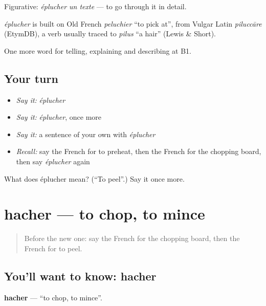 Figurative: \emph{éplucher un texte} — to go through it in detail.

\begin{cousinweb}
\emph{éplucher} is built on Old French \emph{peluchier} \textquotedblleft{}to pick at\textquotedblright{}, from Vulgar Latin \emph{piluccāre} (EtymDB), a verb usually traced to \emph{pilus} \textquotedblleft{}a hair\textquotedblright{} (Lewis \& Short).
\end{cousinweb}

\begin{grammarlens}[title={What you've built}]
One more word for telling, explaining and describing at B1.
\end{grammarlens}

\subsection*{Your turn}
\begin{itemize}
\raggedright
  \item \emph{Say it:} \emph{éplucher}
  \item \emph{Say it:} \emph{éplucher}, once more
  \item \emph{Say it:} a sentence of your own with \emph{éplucher}
  \item \emph{Recall:} say the French for to preheat, then the French for the chopping board, then say \emph{éplucher} again
\end{itemize}

\begin{tcolorbox}[breakable,colback=teal!4,colframe=teal!35!black,title={Before you move on}]
What does éplucher mean? (\textquotedblleft{}To peel\textquotedblright{}.) Say it once more.
\end{tcolorbox}
\section[hacher]{hacher — to chop, to mince}

\label{lesson:FR-C328-hacher}



\begin{quote}
Before the new one: say the French for the chopping board, then the French for to peel.
\end{quote}

\subsection*{You'll want to know: hacher}
\textbf{hacher} — \textquotedblleft{}to chop, to mince\textquotedblright{}.

